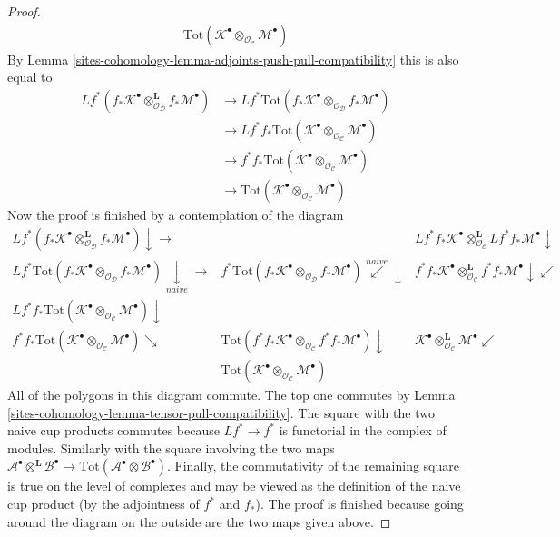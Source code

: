\begin{proof}
\begin{align*}
\text{Tot}(\mathcal{K}^\bullet
\otimes_{\mathcal{O}_\mathcal{C}}
\mathcal{M}^\bullet)
\end{align*}
By Lemma \ref{sites-cohomology-lemma-adjoints-push-pull-compatibility} this is also equal to
\begin{align*}
Lf^*(f_*\mathcal{K}^\bullet
\otimes_{\mathcal{O}_\mathcal{D}}^\mathbf{L}
f_*\mathcal{M}^\bullet)
& \to
Lf^*\text{Tot}(
f_*\mathcal{K}^\bullet
\otimes_{\mathcal{O}_\mathcal{D}}
f_*\mathcal{M}^\bullet) \\
& \to
Lf^*f_*\text{Tot}(\mathcal{K}^\bullet
\otimes_{\mathcal{O}_\mathcal{C}}
\mathcal{M}^\bullet) \\
& \to
f^*f_*\text{Tot}(\mathcal{K}^\bullet
\otimes_{\mathcal{O}_\mathcal{C}}
\mathcal{M}^\bullet) \\
& \to
\text{Tot}(\mathcal{K}^\bullet
\otimes_{\mathcal{O}_\mathcal{C}}
\mathcal{M}^\bullet)
\end{align*}
Now the proof is finished by a contemplation of the diagram
$$
\begin{array}{ccc}Lf^*(f_*\mathcal{K}^\bullet
\otimes_{\mathcal{O}_\mathcal{D}}^\mathbf{L}
f_*\mathcal{M}^\bullet) \downarrow\longrightarrow &  & Lf^*f_*\mathcal{K}^\bullet \otimes_{\mathcal{O}_\mathcal{C}}^\mathbf{L}
Lf^*f_*\mathcal{M}^\bullet \downarrow \\ Lf^*\text{Tot}(
f_*\mathcal{K}^\bullet
\otimes_{\mathcal{O}_\mathcal{D}}
f_*\mathcal{M}^\bullet) \underset{naive}{\downarrow}\longrightarrow & f^*\text{Tot}(
f_*\mathcal{K}^\bullet
\otimes_{\mathcal{O}_\mathcal{D}}
f_*\mathcal{M}^\bullet) \overset{naive}{\swarrow}\downarrow & f^*f_*\mathcal{K}^\bullet \otimes_{\mathcal{O}_\mathcal{C}}^\mathbf{L}
f^*f_*\mathcal{M}^\bullet \downarrow\swarrow \\ Lf^*f_*\text{Tot}(\mathcal{K}^\bullet
\otimes_{\mathcal{O}_\mathcal{C}}
\mathcal{M}^\bullet) \downarrow &  &  \\ f^*f_*\text{Tot}(\mathcal{K}^\bullet \otimes_{\mathcal{O}_\mathcal{C}}
\mathcal{M}^\bullet) \searrow & \text{Tot}(f^*f_*\mathcal{K}^\bullet \otimes_{\mathcal{O}_\mathcal{C}}
f^*f_*\mathcal{M}^\bullet) \downarrow & \mathcal{K}^\bullet \otimes_{\mathcal{O}_\mathcal{C}}^\mathbf{L}
\mathcal{M}^\bullet \swarrow \\  & \text{Tot}(\mathcal{K}^\bullet
\otimes_{\mathcal{O}_\mathcal{C}}
\mathcal{M}^\bullet) & \end{array}
$$
All of the polygons in this diagram commute. The top one commutes
by Lemma \ref{sites-cohomology-lemma-tensor-pull-compatibility}.
The square with the two naive cup products commutes because
$Lf^* \to f^*$ is functorial in the complex of modules.
Similarly with the square involving the two maps
$\mathcal{A}^\bullet \otimes^\mathbf{L} \mathcal{B}^\bullet \to
\text{Tot}(\mathcal{A}^\bullet \otimes \mathcal{B}^\bullet)$.
Finally, the commutativity of the remaining square
is true on the level of complexes and may be viewed as the
definition of the naive cup product (by the adjointness
of $f^*$ and $f_*$). The proof is finished because
going around the diagram on the outside are the two maps
given above.
\end{proof}

